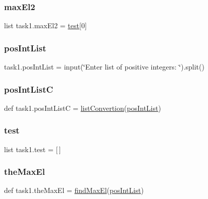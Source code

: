 \mbox{\label{namespacetask1_acbed649192dd192650314ae9d72dc371}} 
\subsubsection{\texorpdfstring{max\+El2}{maxEl2}}
{\footnotesize\ttfamily list task1.\+max\+El2 = \hyperlink{namespacetask1_af2a600c0c28c511d63f0e583147ca4a3}{test}\mbox{[}0\mbox{]}}

\mbox{\label{namespacetask1_aeb30bab29edc92a3d32f397950d9ac2b}} 
\subsubsection{\texorpdfstring{pos\+Int\+List}{posIntList}}
{\footnotesize\ttfamily task1.\+pos\+Int\+List = input(\char`\"{}Enter list of positive integers\+: \char`\"{}).split()}

\mbox{\label{namespacetask1_a6cabdd323ac8029987571a816c6f89a4}} 
\subsubsection{\texorpdfstring{pos\+Int\+ListC}{posIntListC}}
{\footnotesize\ttfamily def task1.\+pos\+Int\+ListC = \hyperlink{namespacetask1_a417fc33e3a3db579a8e974cbd8b80978}{list\+Convertion}(\hyperlink{namespacetask1_aeb30bab29edc92a3d32f397950d9ac2b}{pos\+Int\+List})}

\mbox{\label{namespacetask1_af2a600c0c28c511d63f0e583147ca4a3}} 
\subsubsection{\texorpdfstring{test}{test}}
{\footnotesize\ttfamily list task1.\+test = \mbox{[}$\,$\mbox{]}}

\mbox{\label{namespacetask1_a1910c961e91aa15b50a9d7210903d5c4}} 
\subsubsection{\texorpdfstring{the\+Max\+El}{theMaxEl}}
{\footnotesize\ttfamily def task1.\+the\+Max\+El = \hyperlink{namespacetask1_ab5289f16454d53dc123bcdaa993b8f34}{find\+Max\+El}(\hyperlink{namespacetask1_aeb30bab29edc92a3d32f397950d9ac2b}{pos\+Int\+List})}

